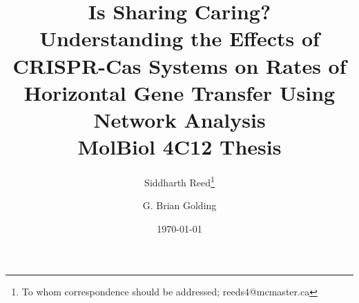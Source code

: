 \documentclass[12pt,letter]{article}
\begin{document}
\title{{\fontsize{30}{50}\selectfont Is Sharing Caring?}\\\vspace{0.4cm}
    Understanding the Effects of CRISPR-Cas Systems on Rates of Horizontal Gene Transfer Using Network Analysis\\\vspace{0.5cm}
       \Large MolBiol 4C12 Thesis}


\author[1]{Siddharth Reed\thanks{To whom correspondence should be addressed; reeds4@mcmaster.ca}}
\author[1]{G. Brian Golding\vspace{-0.45cm}}
\date{\today}
\maketitle

\newpage
\linespread{1.25}%












\printbibliography
\end{document}
